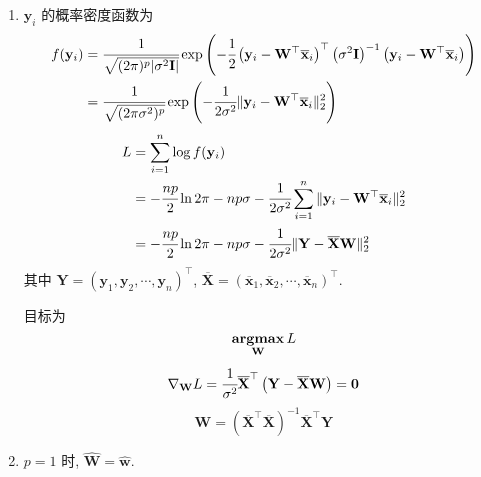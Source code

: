\documentclass[11pt,letter,notitlepage]{article}
\DeclareMathOperator*{\argmax}{\bf argmax}
\begin{document}
\begin{solution}
    \begin{enumerate}
        \item $\mathbf{y}_i$ 的概率密度函数为
              $$\begin{aligned}
                      f(\mathbf{y}_i)
                       & =\cfrac{1}{\sqrt{(2\pi)^p|\sigma^2\mathbf{I}|}}\exp \left( -\cfrac{1}{2} \left( \mathbf{y}_i - \mathbf{W}^\top \overline{\mathbf{x}}_i \right)^\top \left(\sigma^2 \mathbf{I}\right)^{-1} \left( \mathbf{y}_i - \mathbf{W}^\top \overline{\mathbf{x}}_i \right) \right) \\
                       & =\cfrac{1}{\sqrt{(2\pi\sigma^2)^p}}\exp \left( -\cfrac{1}{2\sigma^2} \| \mathbf{y}_i - \mathbf{W}^\top \overline{\mathbf{x}}_i \|_2^2 \right)
                  \end{aligned}$$
              $$\begin{aligned}
                      L & =\sum_{i=1}^n \log f(\mathbf{y}_i)                                                                                                  \\
                        & =-\cfrac{np}{2}\ln 2\pi-np\sigma -\cfrac{1}{2\sigma^2}\sum_{i=1}^n \| \mathbf{y}_i - \mathbf{W}^\top \overline{\mathbf{x}}_i \|_2^2 \\
                        & =-\cfrac{np}{2}\ln 2\pi-np\sigma -\cfrac{1}{2\sigma^2}\|\mathbf{Y}-\overline{\mathbf{X}}\mathbf{W}\|_2^2
                  \end{aligned}$$
              其中 $\mathbf{Y}=(\mathbf{y}_1,\mathbf{y}_2,\cdots,\mathbf{y}_n)^\top$, $\overline{\mathbf{X}}=(\overline{\mathbf{x}}_1,\overline{\mathbf{x}}_2,\cdots,\overline{\mathbf{x}}_n)^\top$.

              目标为
              $$\argmax_{\mathbf{W}} L$$
              $$\nabla_{\mathbf{W}} L=\cfrac{1}{\sigma^2}\overline{\mathbf{X}}^\top\left( \mathbf{Y}-\overline{\mathbf{X}}\mathbf{W} \right)=\mathbf{0}$$
              $$\mathbf{W}=\left(\overline{\mathbf{X}}^\top \overline{\mathbf{X}}\right)^{-1}\overline{\mathbf{X}}^\top\mathbf{Y}$$
        \item $p=1$ 时, $\hat{\mathbf{W}}=\hat{\mathbf{w}}$.
    \end{enumerate}
\end{solution}


\end{document}
